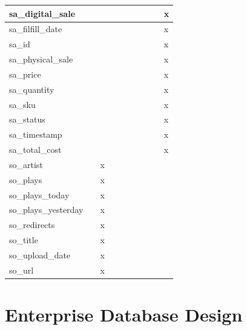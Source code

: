 \documentclass[11pt, a4paper]{report}
\begin{document}
\begin{longtable}{|l|l|l|l|l|l|l|l|l|l|}
sa\_digital\_sale       &                &   &   &   &   &   &   &   & x \\ \hline
sa\_filfill\_date       &                &   &   &   &   &   &   &   & x \\ \hline
sa\_id                  &                &   &   &   &   &   &   &   & x \\ \hline
sa\_physical\_sale      &                &   &   &   &   &   &   &   & x \\ \hline
sa\_price               &                &   &   &   &   &   &   &   & x \\ \hline
sa\_quantity            &                &   &   &   &   &   &   &   & x \\ \hline
sa\_sku                 &                &   &   &   &   &   &   &   & x \\ \hline
sa\_status              &                &   &   &   &   &   &   &   & x \\ \hline
sa\_timestamp           &                &   &   &   &   &   &   &   & x \\ \hline
sa\_total\_cost         &                &   &   &   &   &   &   &   & x \\ \hline
so\_artist              &                & x &   &   &   &   &   &   &   \\ \hline
so\_plays               &                & x &   &   &   &   &   &   &   \\ \hline
so\_plays\_today        &                & x &   &   &   &   &   &   &   \\ \hline
so\_plays\_yesterday    &                & x &   &   &   &   &   &   &   \\ \hline
so\_redirects           &                & x &   &   &   &   &   &   &   \\ \hline
so\_title               &                & x &   &   &   &   &   &   &   \\ \hline
so\_upload\_date        &                & x &   &   &   &   &   &   &   \\ \hline
so\_url                 &                & x &   &   &   &   &   &   &   \\ \hline

\end{longtable}

\chapter{Enterprise Database Design}
\end{document}
